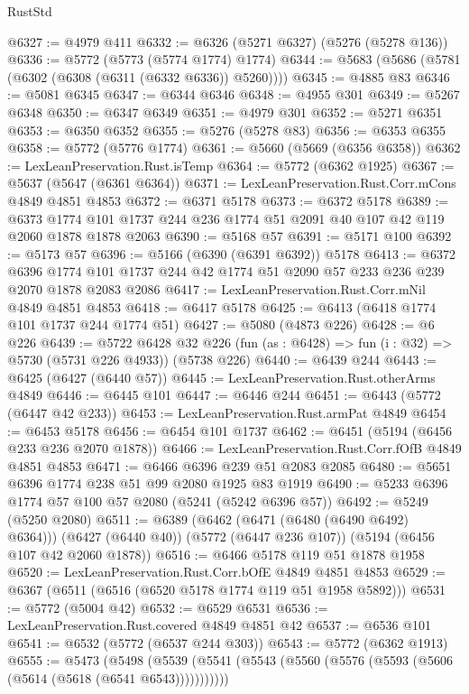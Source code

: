 \begin{lexlean}{RustStd}
\begin{coremodule}
{\begin{coremodule}
{{{{{{{{{{{{{{{{{{{{{{{{{{{{{@6327 := @4979 @411
@6332 := @6326 (@5271 @6327) (@5276 (@5278 @136))
@6336 := @5772 (@5773 (@5774 @1774) @1774)
@6344 := @5683 (@5686 (@5781 (@6302 (@6308 (@6311 (@6332 @6336)) @5260))))
@6345 := @4885 @83
@6346 := @5081 @6345
@6347 := @6344 @6346
@6348 := @4955 @301
@6349 := @5267 @6348
@6350 := @6347 @6349
@6351 := @4979 @301
@6352 := @5271 @6351
@6353 := @6350 @6352
@6355 := @5276 (@5278 @83)
@6356 := @6353 @6355
@6358 := @5772 (@5776 @1774)
@6361 := @5660 (@5669 (@6356 @6358))
@6362 := LexLeanPreservation.Rust.isTemp
@6364 := @5772 (@6362 @1925)
@6367 := @5637 (@5647 (@6361 @6364))
@6371 := LexLeanPreservation.Rust.Corr.mCons @4849 @4851 @4853
@6372 := @6371 @5178
@6373 := @6372 @5178
@6389 := @6373 @1774 @101 @1737 @244 @236 @1774 @51 @2091 @40 @107 @42 @119 @2060 @1878 @1878 @2063
@6390 := @5168 @57
@6391 := @5171 @100
@6392 := @5173 @57
@6396 := @5166 (@6390 (@6391 @6392)) @5178
@6413 := @6372
    @6396
    @1774
    @101
    @1737
    @244
    @42
    @1774
    @51
    @2090
    @57
    @233
    @236
    @239
    @2070
    @1878
    @2083
    @2086
@6417 := LexLeanPreservation.Rust.Corr.mNil @4849 @4851 @4853
@6418 := @6417 @5178
@6425 := @6413 (@6418 @1774 @101 @1737 @244 @1774 @51)
@6427 := @5080 (@4873 @226)
@6428 := @6 @226
@6439 := @5722
    @6428
    @32
    @226
    (fun (as : @6428) => fun (i : @32) => @5730 (@5731 @226 @4933))
    (@5738 @226)
@6440 := @6439 @244
@6443 := @6425 (@6427 (@6440 @57))
@6445 := LexLeanPreservation.Rust.otherArms @4849
@6446 := @6445 @101
@6447 := @6446 @244
@6451 := @6443 (@5772 (@6447 @42 @233))
@6453 := LexLeanPreservation.Rust.armPat @4849
@6454 := @6453 @5178
@6456 := @6454 @101 @1737
@6462 := @6451 (@5194 (@6456 @233 @236 @2070 @1878))
@6466 := LexLeanPreservation.Rust.Corr.fOfB @4849 @4851 @4853
@6471 := @6466 @6396 @239 @51 @2083 @2085
@6480 := @5651 @6396 @1774 @238 @51 @99 @2080 @1925 @83 @1919
@6490 := @5233 @6396 @1774 @57 @100 @57 @2080 (@5241 (@5242 @6396 @57))
@6492 := @5249 (@5250 @2080)
@6511 := @6389
    (@6462 (@6471 (@6480 (@6490 @6492) @6364)))
    (@6427 (@6440 @40))
    (@5772 (@6447 @236 @107))
    (@5194 (@6456 @107 @42 @2060 @1878))
@6516 := @6466 @5178 @119 @51 @1878 @1958
@6520 := LexLeanPreservation.Rust.Corr.bOfE @4849 @4851 @4853
@6529 := @6367 (@6511 (@6516 (@6520 @5178 @1774 @119 @51 @1958 @5892)))
@6531 := @5772 (@5004 @42)
@6532 := @6529 @6531
@6536 := LexLeanPreservation.Rust.covered @4849 @4851 @42
@6537 := @6536 @101
@6541 := @6532 (@5772 (@6537 @244 @303))
@6543 := @5772 (@6362 @1913)
@6555 := @5473
    (@5498 (@5539 (@5541 (@5543 (@5560 (@5576 (@5593 (@5606 (@5614 (@5618 (@6541 @6543)))))))))))
}}}}}}}}}}}}}}}}}}}}}}}}}}}}}
\end{coremodule}}
\end{coremodule}
\end{lexlean}
